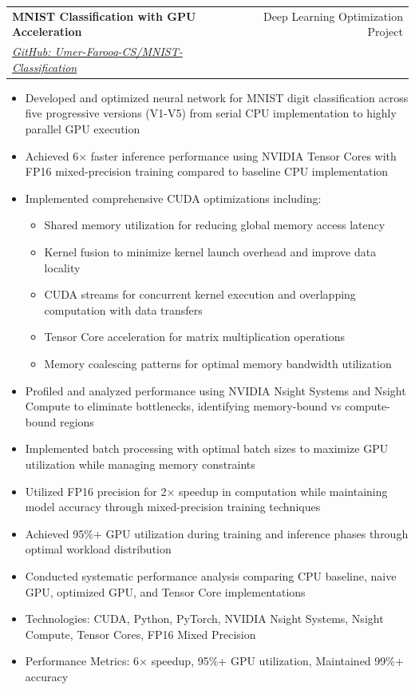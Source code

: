 \documentclass[a4paper,12pt]{article}
\makeatletter
\newenvironment{projectdetailed}[3]
    {
    \begin{tabularx}{\linewidth}{@{}l X r@{}}
    \textbf{#1} & \hfill & #2 \\
    \textit{#3} & & \\[3.75pt]
    \end{tabularx}
    \begin{minipage}[t]{\linewidth}
    \begin{itemize}[nosep,after=\strut, leftmargin=1em, itemsep=2pt,label=--]
    }
    {
    \end{itemize}
    \end{minipage}
    \vspace{6pt}
    }
\makeatother
\begin{document}
\begin{projectdetailed}{MNIST Classification with GPU Acceleration}{Deep Learning Optimization Project}{\href{https://github.com/Umer-Farooq-CS/MNIST-Classification}{GitHub: Umer-Farooq-CS/MNIST-Classification}}
\item Developed and optimized neural network for MNIST digit classification across five progressive versions (V1-V5) from serial CPU implementation to highly parallel GPU execution
\item Achieved 6× faster inference performance using NVIDIA Tensor Cores with FP16 mixed-precision training compared to baseline CPU implementation
\item Implemented comprehensive CUDA optimizations including:
\begin{itemize}[nosep, leftmargin=2em]
    \item Shared memory utilization for reducing global memory access latency
    \item Kernel fusion to minimize kernel launch overhead and improve data locality
    \item CUDA streams for concurrent kernel execution and overlapping computation with data transfers
    \item Tensor Core acceleration for matrix multiplication operations
    \item Memory coalescing patterns for optimal memory bandwidth utilization
\end{itemize}
\item Profiled and analyzed performance using NVIDIA Nsight Systems and Nsight Compute to eliminate bottlenecks, identifying memory-bound vs compute-bound regions
\item Implemented batch processing with optimal batch sizes to maximize GPU utilization while managing memory constraints
\item Utilized FP16 precision for 2× speedup in computation while maintaining model accuracy through mixed-precision training techniques
\item Achieved 95\%+ GPU utilization during training and inference phases through optimal workload distribution
\item Conducted systematic performance analysis comparing CPU baseline, naive GPU, optimized GPU, and Tensor Core implementations
\item Technologies: CUDA, Python, PyTorch, NVIDIA Nsight Systems, Nsight Compute, Tensor Cores, FP16 Mixed Precision
\item Performance Metrics: 6× speedup, 95\%+ GPU utilization, Maintained 99\%+ accuracy
\end{projectdetailed}
\end{document}
